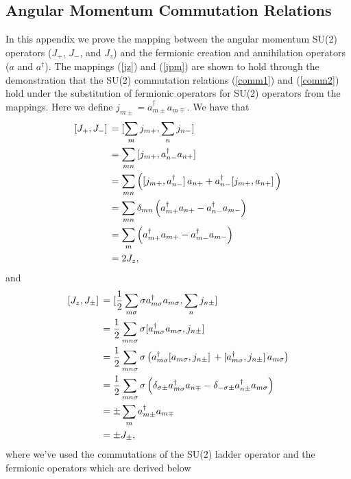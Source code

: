 \documentclass[Dual]{msu-thesis}
\begin{document}
\begin{appendices}

\chapter{Angular Momentum Commutation Relations} 
\label{appendix:angular_momentum_commutation_relations}

In this appendix we prove the mapping between the angular momentum SU(2) operators ($J_+$, $J_-$, and $J_z$) and the fermionic creation and annihilation operators ($a$ and $a^\dagger$). The mappings (\ref{jz}) and (\ref{jpm}) are shown to hold through the demonstration that the SU(2) commutation relations (\ref{comm1}) and (\ref{comm2}) hold under the substitution of fermionic operators for SU(2) operators from the mappings. Here we define $j_{m\pm}= a^\dagger_{m\pm}a_{m\mp}$. We have that
\begin{align}
\comm*{J_+}{J_-}
&=
\comm*{\sum_mj_{m+}}{\sum_nj_{n-}}
\nonumber
\\
&=
\sum_{mn}\comm*{j_{m+}}{a^{\dagger}_{n-}a_{n+}}
\nonumber
\\
&=
\sum_{mn}\left(\comm*{j_{m+}}{a^{\dagger}_{n-}}a_{n+}+a^{\dagger}_{n-}\comm*{j_{m+}}{a_{n+}}\right)
\nonumber
\\
&=
\sum_{mn}\delta_{mn}\left(a^{\dagger}_{m+}a_{n+}-a^{\dagger}_{n-}a_{m-}\right)
\nonumber
\\
&=
\sum_{m}\left(a^{\dagger}_{m+}a_{m+}-a^{\dagger}_{m-}a_{m-}\right)
\nonumber
\\
&=2J_z,
\end{align}
and
\begin{align}
\comm*{J_z}{J_\pm}
&=
\comm*{\frac{1}{2}\sum_{m\sigma}\sigma a^{\dagger}_{m\sigma}a_{m\sigma}}{\sum_{n}j_{n\pm}}
\nonumber
\\
&=
\frac{1}{2}\sum_{mn\sigma}\sigma\comm*{a^{\dagger}_{m\sigma}a_{m\sigma}}{j_{n\pm}}
\nonumber
\\
&=
\frac{1}{2}\sum_{mn\sigma}\sigma
\left(
a^{\dagger}_{m\sigma}\comm*{a_{m\sigma}}{j_{n\pm}}
+
\comm*{a^{\dagger}_{m\sigma}}{j_{n\pm}}a_{m\sigma}
\right)
\nonumber
\\
&=
\frac{1}{2}\sum_{mn\sigma}\sigma
\left(
\delta_{\sigma\pm}a^{\dagger}_{m\sigma}a_{n\mp}
-
\delta_{-\sigma\pm}a^{\dagger}_{n\pm}a_{m\sigma}\right)
\nonumber
\\
&=
\pm\sum_ma^{\dagger}_{m\pm}a_{m\mp}
\nonumber
\\
&=
\pm J_{\pm},
\end{align}
where we've used the commutations of the SU(2) ladder operator and the fermionic operators which are derived below

\end{appendices}
\end{document}

